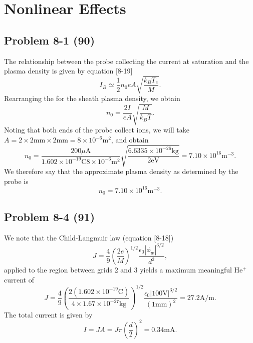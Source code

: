 \chapter{Nonlinear Effects}
\label{ch:Eight}

\section*{Problem 8-1 (90)}
\label{sec:8-1}
The relationship between the probe collecting the current at saturation and the plasma density is given by equation [8-19]
\begin{equation*}
	I_B \simeq \frac{1}{2}n_0eA\sqrt{\dfrac{k_BT_e}{M}}.
\end{equation*}
Rearranging the for the sheath plasma density, we obtain
\begin{equation*}
	n_0 = \dfrac{2I}{eA} \sqrt{\dfrac{M}{k_BT}}.
\end{equation*}
Noting that both ends of the probe collect ions, we will take \(A = 2 \times 2\text{mm}\times 2\text{mm} = 8 \times 10^{-6}\text{m}^2\), and obtain
\begin{equation*}
	n_0 = \dfrac{200\mu\text{A}}{1.602\times 10^{-19}\text{C}8 \times 10^{-6}\text{m}^2} \sqrt{\dfrac{6.6335\times 10^{-26}\text{kg}}{2\text{eV}}} = 7.10\times 10^{16}\text{m}^{-3}.
\end{equation*}
We therefore say that the approximate plasma density as determined by the probe is
\begin{equation*}
	n_0 = 7.10\times 10^{16}\text{m}^{-3}.
\end{equation*}

\section*{Problem 8-4 (91)}
\label{sec:8-4}
We note that the Child-Langmuir law (equation [8-18])
\begin{equation*}
	J = \dfrac{4}{9}\left(\dfrac{2e}{M}\right)^{1/2}\dfrac{\epsilon_0\left|\phi_w\right|^{3/2}}{d^2},
\end{equation*}
applied to the region between grids 2 and 3 yields a maximum meaningful He\(^+\) current of
\begin{equation*}
	J = \dfrac{4}{9}\left(\dfrac{2(1.602\times 10^{-19}\text{C})}{4\times 1.67 \times 10^{-27}\text{kg}}\right)^{1/2} \dfrac{\epsilon_0\left|100\text{V}\right|^{3/2}}{(1\text{mm})^2} = 27.2\text{A/m}.
\end{equation*}
The total current is given by
\begin{equation*}
	I = JA = J\pi\left(\dfrac{d}{2}\right)^2 = 0.34\text{mA}.
\end{equation*}

